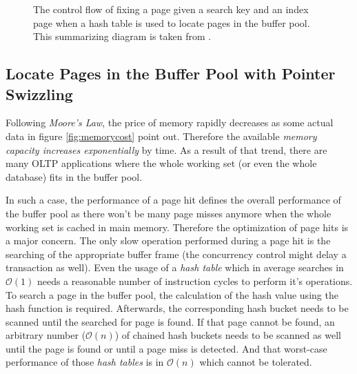 \begin{@empty}
\begin{figure}[ht!]
{
		}
        \vspace{.5em}
		\caption[Control flow of fixing a page without pointer swizzling]{The control flow of fixing a page given a search key and an index page when a hash table is used to locate pages in the buffer pool. This summarizing diagram is taken from \cite{Graefe:2014}.}
		\label{fig:locatehash}
	\end{figure}
\end{@empty}

\subsection[With Pointer Swizzling]{Locate Pages in the Buffer Pool with Pointer Swizzling} \label{subsec:conceptbufferswizzling}

	Following \emph{Moore's Law}, the price of memory rapidly decreases as some actual data in figure \ref{fig:memorycost} point out. Therefore the available \emph{memory capacity increases exponentially} by time. As a result of that trend, there are many OLTP applications where the whole working set (or even the whole database) fits in the buffer pool.
	
	In such a case, the performance of a page hit defines the overall performance of the buffer pool as there won't be many page misses anymore when the whole working set is cached in main memory. Therefore the optimization of page hits is a major concern. The only slow operation performed during a page hit is the searching of the appropriate buffer frame (the concurrency control might delay a transaction as well). Even the usage of a \emph{hash table} which in average searches in $\mathcal{O}\left(1\right)$ needs a reasonable number of instruction cycles to perform it's operations. To search a page in the buffer pool, the calculation of the hash value using the hash function is required. Afterwards, the corresponding hash bucket needs to be scanned until the searched for page is found. If that page cannot be found, an arbitrary number ($\mathcal{O}\left(n\right)$) of chained hash buckets needs to be scanned as well until the page is found or until a page miss is detected. And that worst-case performance of those \emph{hash tables} is in $\mathcal{O}\left(n\right)$ which cannot be tolerated.

